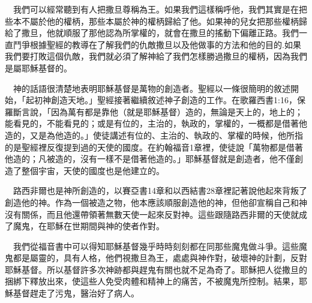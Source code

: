 \documentclass{book}
\begin{document}
\begin{center}
\noindent{}
\end{center}

　我們可以經常聽到有人把撒旦尊稱為王。如果我們這樣稱呼他，我們其實是在把些本不屬於他的權柄，那些本屬於神的權柄歸給了他。如果神的兒女把那些權柄歸給了撒旦，他就順服了那他認為所掌權的，就會在撒旦的搖動下偏離正路。我們一直鬥爭根據聖經的教導在了解我們的仇敵撒旦以及他做事的方法和他的目的.如果我們要打敗這個仇敵，我們就必須了解神給了我們怎樣勝過撒旦的權柄，因為我們是屬耶穌基督的。

　神的話語很清楚地表明耶穌基督是萬物的創造者。聖經以一條很簡明的敘述開始，「起初神創造天地。」聖經接著繼續敘述神子創造的工作。在歌羅西書1:16，保羅斷言說，「因為萬有都是靠他（就是耶穌基督）造的，無論是天上的，地上的；能看見的，不能看見的；或是有位的，主治的，執政的，掌權的，一概都是借著他造的，又是為他造的。」使徒講述有位的、主治的、執政的、掌權的時候，他所指的是聖經裡反復提到過的天使的國度。在約翰福音1章裡，使徒說「萬物都是借著他造的；凡被造的，沒有一樣不是借著他造的。」耶穌基督就是創造者，他不僅創造了整個宇宙，天使的國度也是他建立的。

　路西非爾也是神所創造的，以賽亞書14章和以西結書28章裡記著說他起來背叛了創造他的神。作為一個被造之物，他本應該順服創造他的神，但他卻宣稱自己和神沒有關係，而且他還帶領著無數天使一起來反對神。這些跟隨路西非爾的天使就成了魔鬼，在耶穌在世期間與神的使者作對。

　我們從福音書中可以得知耶穌基督幾乎時時刻刻都在同那些魔鬼做斗爭。這些魔鬼都是屬靈的，具有人格，他們視撒旦為王，處處與神作對，破壞神的計劃，反對耶穌基督。所以基督許多次神跡都與趕鬼有關也就不足為奇了。耶穌把人從撒旦的捆綁下釋放出來，使這些人免受肉體和精神上的痛苦，不被魔鬼所控制。結果，耶穌基督趕走了污鬼，醫治好了病人。
\end{document}
